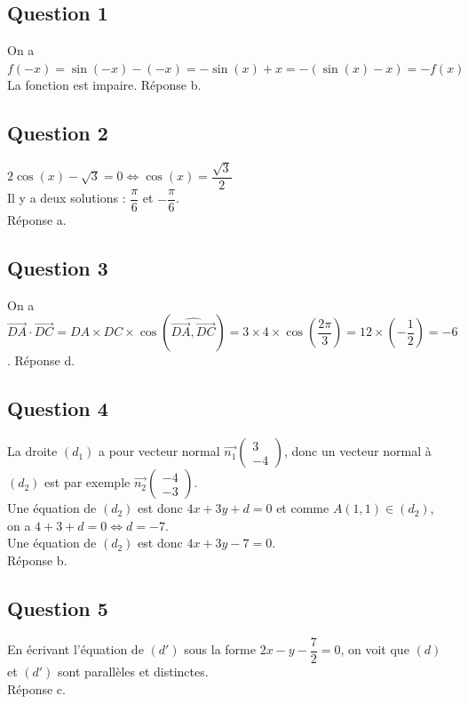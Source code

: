 \subsection*{Question 1}
	

	On a \(f(-x) = \sin(-x) - (-x) = -\sin(x) + x = -(\sin(x) - x) = -f(x)\)\\
	La fonction est impaire. Réponse b.
	
	\subsection*{Question 2}
	

	\(2\cos(x) - \sqrt{3} = 0 \iff \cos(x) = \dfrac{\sqrt{3}}{2}\) \\
	Il y a deux solutions : \(\dfrac{\pi}{6}\) et \(-\dfrac{\pi}{6}\).\\
	 Réponse a.
	
	\subsection*{Question 3}
	

	On a \(\overrightarrow{DA} \cdot \overrightarrow{DC} = DA \times DC \times \cos(\widehat{ \overrightarrow{DA}, \overrightarrow{DC}}) = 3 \times 4 \times \cos\left(\dfrac{2\pi}{3}\right) = 12 \times \left(-\dfrac{1}{2}\right) = -6\). Réponse d.
	
	\subsection*{Question 4}
	

	La droite \((d_1)\) a pour vecteur normal \(\overrightarrow{n_1}\begin{pmatrix}3\\ -4\end{pmatrix}\), donc un vecteur normal à \((d_2)\) est par exemple \(\overrightarrow{n_2}\begin{pmatrix}-4\\ -3\end{pmatrix}\).\\
	 Une équation de \((d_2)\) est donc \(4x + 3y + d = 0\) et comme \(A(1, 1) \in (d_2)\),\\ on a \(4 + 3 + d = 0 \iff d = -7\).\\ Une équation de \((d_2)\) est donc \(4x + 3y - 7 = 0\). \\Réponse b.
	
	\subsection*{Question 5}
	

	
	En écrivant l'équation de \((d')\) sous la forme \(2x - y - \dfrac{7}{2} = 0\), on voit que \((d)\) et \((d')\) sont parallèles et distinctes. \\
	Réponse c.
